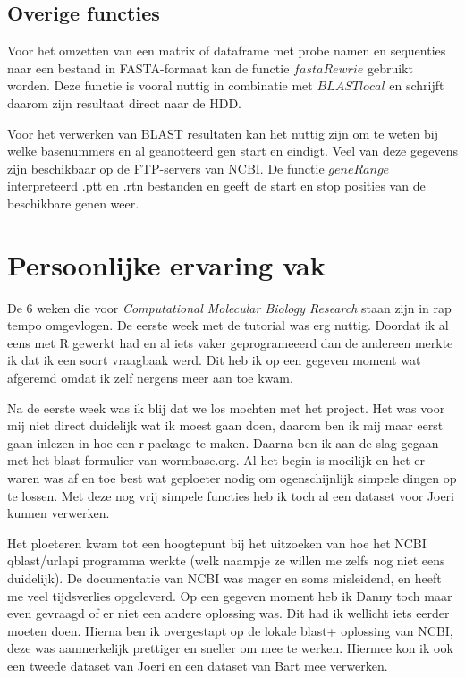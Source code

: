 \documentclass[a4paper]{article}
\begin{document}
\subsection*{Overige functies}
Voor het omzetten van een matrix of dataframe met probe namen en sequenties naar een bestand in FASTA-formaat kan de functie $fastaRewrie$ gebruikt worden. Deze functie is vooral nuttig in combinatie met $BLASTlocal$ en schrijft daarom zijn resultaat direct naar de HDD.

Voor het verwerken van BLAST resultaten kan het nuttig zijn om te weten bij welke basenummers en al geanotteerd gen start en eindigt. Veel van deze gegevens zijn beschikbaar op de FTP-servers van NCBI\cite{NCBIftp}. De functie $geneRange$ interpreteerd .ptt en .rtn bestanden en geeft de start en stop posities van de beschikbare genen weer.

\section*{Persoonlijke ervaring vak}
De 6 weken die voor \emph{Computational Molecular Biology Research} staan zijn in rap tempo omgevlogen. De eerste week met de tutorial was erg nuttig. Doordat ik al eens met R gewerkt had en al iets vaker geprogrameeerd dan de andereen merkte ik dat ik een soort vraagbaak werd. Dit heb ik op een gegeven moment wat afgeremd omdat ik zelf nergens meer aan toe kwam.

Na de eerste week was ik blij dat we los mochten met het project. Het was voor mij niet direct duidelijk wat ik moest gaan doen, daarom ben ik mij maar eerst gaan inlezen in hoe een r-package te maken. Daarna ben ik aan de slag gegaan met het blast formulier van wormbase.org. Al het begin is moeilijk en het er waren was af en toe best wat geploeter nodig om ogenschijnlijk simpele dingen op te lossen. Met deze nog vrij simpele functies heb ik toch al een dataset voor Joeri kunnen verwerken.

Het ploeteren kwam tot een hoogtepunt bij het uitzoeken van hoe het NCBI qblast/urlapi programma werkte (welk naampje ze willen me zelfs nog niet eens duidelijk). De documentatie van NCBI was mager en soms misleidend, en heeft me veel tijdsverlies opgeleverd. Op een gegeven moment heb ik Danny toch maar even gevraagd of er niet een andere oplossing was. Dit had ik wellicht iets eerder moeten doen.
Hierna ben ik overgestapt op de lokale blast+ oplossing van NCBI, deze was aanmerkelijk prettiger en sneller om mee te werken. Hiermee kon ik ook een tweede dataset van Joeri en een dataset van Bart mee verwerken. 
\end{document}
